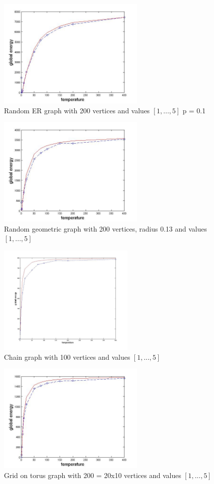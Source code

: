 \documentclass[12pt]{report}
\begin{document}
\begin{figure}[ht]
    \centering
    \includegraphics[height=200px]{er200x01}
    \caption{ Random ER graph with 200 vertices and values $[1, ..., 5]$ p = 0.1}
\end{figure}

\begin{figure}[ht]
    \centering
    \includegraphics[height=200px]{rgg200x013}
    \caption{ Random geometric graph with 200 vertices, radius 0.13 and values $[1, ..., 5]$ }
\end{figure}

\begin{figure}[ht]
    \centering
    \includegraphics[height=200px]{chain200}
    \caption{ Chain graph with 100 vertices and values $[1, ..., 5]$}
\end{figure}

\begin{figure}[ht]
    \centering
    \includegraphics[height=200px]{grid20x10}
    \caption{ Grid on torus graph with 200 = 20x10 vertices and values $[1, ..., 5]$ }
\end{figure}
\end{document}

